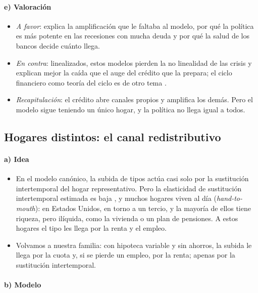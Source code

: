\documentclass[11pt]{article}
\begin{document}
\paragraph{e) Valoración}
\begin{itemize}
\item \emph{A favor}: explica la amplificación que le faltaba al modelo, por qué la política es más potente en las recesiones con mucha deuda y por qué la salud de los bancos decide cuánto llega.
\item \emph{En contra}: linealizados, estos modelos pierden la no linealidad de las crisis y explican mejor la caída que el auge del crédito que la prepara; el ciclo financiero como teoría del ciclo es de otro tema .
\item \emph{Recapitulación}: el crédito abre canales propios y amplifica los demás. Pero el modelo sigue teniendo un único hogar, y la política no llega igual a todos.
\end{itemize}

\subsection{Hogares distintos: el canal redistributivo}\label{sec:heterogeneidad}

\paragraph{a) Idea}
\begin{itemize}
\item En el modelo canónico, la subida de tipos actúa casi solo por la sustitución intertemporal del hogar representativo. Pero la elasticidad de sustitución intertemporal estimada es baja , y muchos hogares viven al día (\emph{hand-to-mouth}): en Estados Unidos, en torno a un tercio, y la mayoría de ellos tiene riqueza, pero ilíquida, como la vivienda o un plan de pensiones\nocite{KaplanViolanteWeidner2014Wealthy}. A estos hogares el tipo les llega por la renta y el empleo.
\item Volvamos a nuestra familia: con hipoteca variable y sin ahorros, la subida le llega por la cuota y, si se pierde un empleo, por la renta; apenas por la sustitución intertemporal.
\end{itemize}

\paragraph{b) Modelo}
\end{document}
